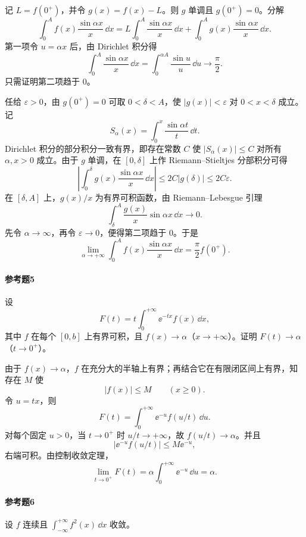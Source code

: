 \begin{xsolution}
记 $L=f(0^+)$，并令 $g(x)=f(x)-L$。则 $g$ 单调且 $g(0^+)=0$。分解
\[
\int_0^A f(x)\frac{\sin\alpha x}{x}\,\dd x
=L\int_0^A\frac{\sin\alpha x}{x}\,\dd x
+\int_0^A g(x)\frac{\sin\alpha x}{x}\,\dd x.
\]
第一项令 $u=\alpha x$ 后，由 Dirichlet 积分得
\[
\int_0^A\frac{\sin\alpha x}{x}\,\dd x
=\int_0^{\alpha A}\frac{\sin u}{u}\,\dd u\to\frac\pi2.
\]
只需证明第二项趋于 $0$。

任给 $\varepsilon>0$，由 $g(0^+)=0$ 可取 $0<\delta<A$，使
$|g(x)|<\varepsilon$ 对 $0<x<\delta$ 成立。记
\[
S_\alpha(x)=\int_0^x\frac{\sin\alpha t}{t}\,\dd t.
\]
Dirichlet 积分的部分积分一致有界，即存在常数 $C$ 使
$|S_\alpha(x)|\leqslant C$ 对所有 $\alpha,x>0$ 成立。由于 $g$ 单调，在 $[0,\delta]$ 上作 Riemann--Stieltjes 分部积分可得
\[
\left|\int_0^\delta g(x)\frac{\sin\alpha x}{x}\,\dd x\right|
\leqslant2C|g(\delta)|\leqslant2C\varepsilon.
\]
在 $[\delta,A]$ 上，$g(x)/x$ 为有界可积函数，由 Riemann--Lebesgue 引理
\[
\int_\delta^A\frac{g(x)}x\sin\alpha x\,\dd x\to0.
\]
先令 $\alpha\to\infty$，再令 $\varepsilon\to0$，便得第二项趋于 $0$。于是
\[
\boxed{
\lim_{\alpha\to+\infty}
\int_0^A f(x)\frac{\sin\alpha x}{x}\,\dd x
=\frac\pi2f(0^+).}
\]
\end{xsolution}

\paragraph{参考题5}
设
\[
F(t)=t\int_0^{+\infty}\ee^{-tx}f(x)\,\dd x,
\]
其中 $f$ 在每个 $[0,b]$ 上有界可积，且 $f(x)\to\alpha$（$x\to+\infty$）。证明
$F(t)\to\alpha$（$t\to0^+$）。

\begin{xsolution}
由于 $f(x)\to\alpha$，$f$ 在充分大的半轴上有界；再结合它在有限闭区间上有界，知存在 $M$ 使
\[
|f(x)|\leqslant M\qquad(x\geqslant0).
\]
令 $u=tx$，则
\[
F(t)=\int_0^{+\infty}\ee^{-u}f(u/t)\,\dd u.
\]
对每个固定 $u>0$，当 $t\to0^+$ 时 $u/t\to+\infty$，故
$f(u/t)\to\alpha$。并且
\[
|\ee^{-u}f(u/t)|\leqslant M\ee^{-u},
\]
右端可积。由控制收敛定理，
\[
\boxed{
\lim_{t\to0^+}F(t)
=\alpha\int_0^{+\infty}\ee^{-u}\,\dd u=\alpha.}
\]
\end{xsolution}

\paragraph{参考题6}
设 $f$ 连续且 $\int_{-\infty}^{+\infty}f^2(x)\,\dd x$ 收敛。

